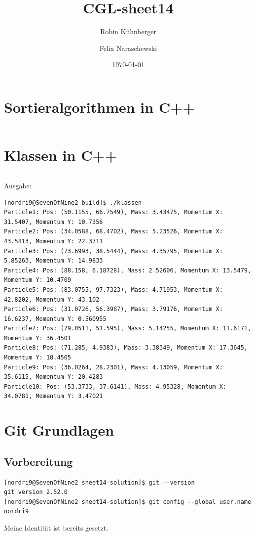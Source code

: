 \documentclass{scrartcl}
\title{CGL-sheet14}
\author[1]{Robin Kühnberger}
\author[2]{Felix Naraschewski}
\affil[1]{University Stuttgart}
\affil[2]{University Stuttgart}
\date{\today}
\begin{document}
\maketitle
\tableofcontents

\section{Sortieralgorithmen in C++}

\inputminted[breaklines, linenos, bgcolor=gray!10]{cpp}{sortieralgorithmen.cpp}

\section{Klassen in C++}

\inputminted[breaklines, linenos, bgcolor=gray!10]{cpp}{klassen.cpp}

Ausgabe:

\begin{verbatim}
[nordri9@SevenOfNine2 build]$ ./klassen 
Particle1: Pos: (50.1155, 66.7549), Mass: 3.43475, Momentum X: 31.5407, Momentum Y: 10.7356
Particle2: Pos: (34.0588, 68.4702), Mass: 5.23526, Momentum X: 43.5813, Momentum Y: 22.3711
Particle3: Pos: (73.6993, 38.5444), Mass: 4.35795, Momentum X: 5.85263, Momentum Y: 14.9833
Particle4: Pos: (88.158, 6.18728), Mass: 2.52606, Momentum X: 13.5479, Momentum Y: 10.4709
Particle5: Pos: (83.0755, 97.7323), Mass: 4.71953, Momentum X: 42.8202, Momentum Y: 43.102
Particle6: Pos: (31.0726, 56.3987), Mass: 3.79176, Momentum X: 16.6237, Momentum Y: 0.560955
Particle7: Pos: (79.0511, 51.595), Mass: 5.14255, Momentum X: 11.6171, Momentum Y: 36.4501
Particle8: Pos: (71.285, 4.9383), Mass: 3.38349, Momentum X: 17.3645, Momentum Y: 18.4505
Particle9: Pos: (36.0264, 28.2301), Mass: 4.13059, Momentum X: 35.6115, Momentum Y: 20.4283
Particle10: Pos: (53.3733, 37.6141), Mass: 4.95328, Momentum X: 34.0781, Momentum Y: 3.47021
\end{verbatim}

\section{Git Grundlagen}
\subsection*{Vorbereitung}

\begin{verbatim}
[nordri9@SevenOfNine2 sheet14-solution]$ git --version
git version 2.52.0
[nordri9@SevenOfNine2 sheet14-solution]$ git config --global user.name
nordri9
\end{verbatim}
Meine Identität ist bereits gesetzt.
\end{document}
